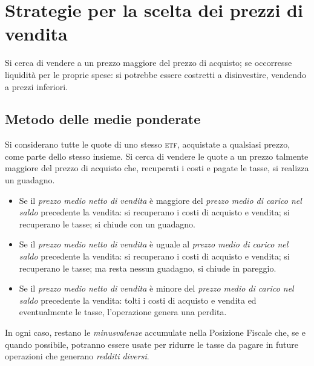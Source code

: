 \documentclass[12pt,a4paper]{article}
\newcommand{\Etf}[1]{\textsc{etf}}
\begin{document}
\section{Strategie per la scelta dei prezzi di vendita}


Si cerca  di vendere a  un prezzo maggiore  del prezzo di acquisto;  se occorresse liquidità  per le
proprie spese: si potrebbe essere costretti a disinvestire, vendendo a prezzi inferiori.

\subsection{Metodo delle medie ponderate}




Si considerano tutte le quote di uno stesso  \Etf{}, acquistate a qualsiasi prezzo, come parte dello
stesso insieme.  Si cerca  di vendere le quote a un prezzo talmente  maggiore del prezzo di acquisto
che, recuperati i costi e pagate le tasse, si realizza un guadagno.
\begin{itemize}
\item Se  il \emph{prezzo medio netto  di vendita} è maggiore  del \emph{prezzo medio di  carico nel
     saldo} precedente  la vendita: si recuperano  i costi di  acquisto e vendita; si  recuperano le
  tasse; si chiude con un guadagno.

\item Se il \emph{prezzo medio netto di vendita} è uguale al \emph{prezzo medio di carico nel saldo}
  precedente la  vendita: si recuperano i  costi di acquisto e  vendita; si recuperano le  tasse; ma
  resta nessun guadagno, si chiude in pareggio.

\item Se  il \emph{prezzo  medio netto di  vendita} è  minore del \emph{prezzo  medio di  carico nel
     saldo} precedente la  vendita: tolti i costi  di acquisto e vendita ed  eventualmente le tasse,
  l'operazione genera una perdita.
\end{itemize}
In ogni  caso, restano le  \emph{minusvalenze} accumulate nella Posizione  Fiscale che, se  e quando
possibile, potranno essere  usate per ridurre le  tasse da pagare in future  operazioni che generano
\emph{redditi diversi}.
\end{document}
